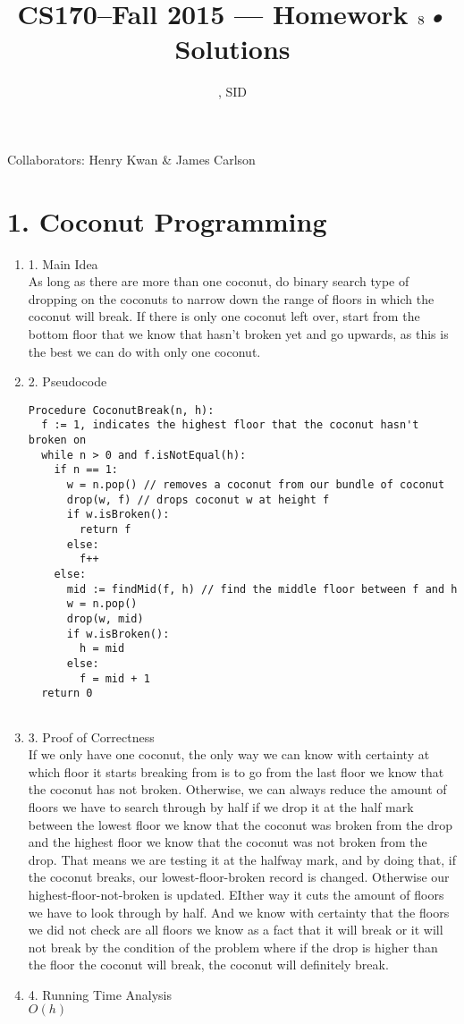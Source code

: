 \documentclass[11pt]{article}
\title{CS170--Fall 2015 --- Homework $8$\textsl{•} Solutions}
\author{\Name, SID \SID}
\date{}
\newenvironment{qparts}{\begin{enumerate}[{(}a{)}]}{\end{enumerate}}
\begin{document}
\maketitle

Collaborators: Henry Kwan \& James Carlson

\section*{1. Coconut Programming}
\begin{qparts}
\item[1.] Main Idea \\
As long as there are more than one coconut, do binary search type of dropping on the coconuts to narrow down the range of floors in which the coconut will break. If there is only one coconut left over, start from the bottom floor that we know that hasn't broken yet and go upwards, as this is the best we can do with only one coconut. 
\item[2.] Pseudocode
\begin{verbatim}
Procedure CoconutBreak(n, h):
  f := 1, indicates the highest floor that the coconut hasn't broken on
  while n > 0 and f.isNotEqual(h):
    if n == 1:
      w = n.pop() // removes a coconut from our bundle of coconut
      drop(w, f) // drops coconut w at height f
      if w.isBroken():
        return f
      else:
        f++
    else:
      mid := findMid(f, h) // find the middle floor between f and h
      w = n.pop()
      drop(w, mid)
      if w.isBroken():
        h = mid
      else:
        f = mid + 1
  return 0
  
\end{verbatim}
\item[3.] Proof of Correctness \\
If we only have one coconut, the only way we can know with certainty at which floor it starts breaking from is to go from the last floor we know that the coconut has not broken. Otherwise, we can always reduce the amount of floors we have to search through by half if we drop it at the half mark between the lowest floor we know that the coconut was broken from the drop and the highest floor we know that the coconut was not broken from the drop. That means we are testing it at the halfway mark, and by doing that, if the coconut breaks, our lowest-floor-broken record is changed. Otherwise our highest-floor-not-broken is updated. EIther way it cuts the amount of floors we have to look through by half. And we know with certainty that the floors we did not check are all floors we know as a fact that it will break or it will not break by the condition of the problem where if the drop is higher than the floor the coconut will break, the coconut will definitely break.
\item[4.] Running Time Analysis \\
$O(h)$


\end{qparts}
\end{document}
